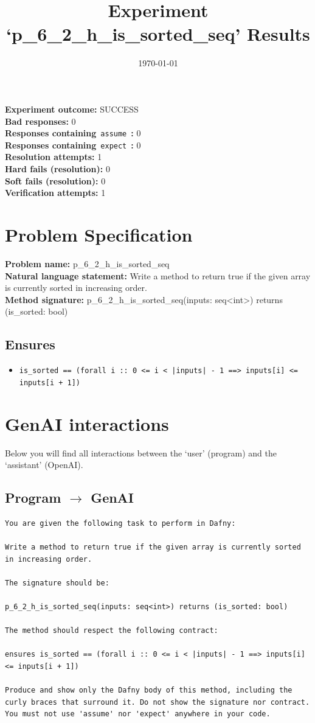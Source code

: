 \documentclass{article}
\begin{document}
\title{Experiment `p\_6\_2\_h\_is\_sorted\_seq' Results}
\author{\today}
\date{}
\maketitle
\textbf{Experiment outcome: }SUCCESS
\\\textbf{Bad responses: }0
\\\textbf{Responses containing}~\texttt{assume}~\textbf{: }0
\\\textbf{Responses containing}~\texttt{expect}~\textbf{: }0
\\\textbf{Resolution attempts: }1
\\\textbf{Hard fails (resolution): }0
\\\textbf{Soft fails (resolution): }0
\\\textbf{Verification attempts: }1
\section*{Problem Specification}
\textbf{Problem name: }p\_6\_2\_h\_is\_sorted\_seq
\\\textbf{Natural language statement: }Write a method to return true if the given array is currently sorted in increasing order.
\\\textbf{Method signature: }p\_6\_2\_h\_is\_sorted\_seq(inputs: seq<int>) returns (is\_sorted: bool)
\subsection*{Ensures}
\begin{itemize}
\item \texttt{is\_sorted == (forall i :: 0 <= i < |inputs| - 1 ==> inputs[i] <= inputs[i + 1])}
\end{itemize}
\clearpage
\section*{GenAI interactions}
Below you will find all interactions between the `user' (program) and the `assistant' (OpenAI).
\subsection*{Program $\rightarrow$ GenAI}
\begin{lstlisting}
You are given the following task to perform in Dafny:

Write a method to return true if the given array is currently sorted in increasing order.

The signature should be:

p_6_2_h_is_sorted_seq(inputs: seq<int>) returns (is_sorted: bool)

The method should respect the following contract:

ensures is_sorted == (forall i :: 0 <= i < |inputs| - 1 ==> inputs[i] <= inputs[i + 1])

Produce and show only the Dafny body of this method, including the curly braces that surround it. Do not show the signature nor contract. You must not use 'assume' nor 'expect' anywhere in your code.
\end{lstlisting}
\end{document}
